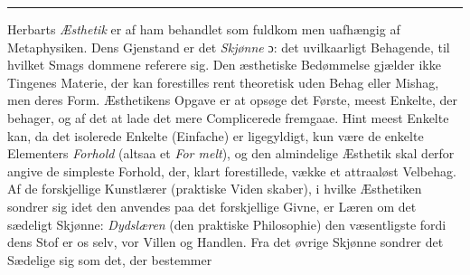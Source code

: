 \documentclass[12pt,a4paper]{book}
\newcommand{\divrule}{\begin{center}\rule{2cm}{0.4pt}\end{center}}
\begin{document}
\divrule

Herbarts \emph{Æsthetik} er af ham behandlet som fuldkom\-%
men uafhængig af Metaphysiken. Dens Gjenstand er det
\emph{Skjønne} ɔ: det uvilkaarligt Behagende, til hvilket Smags\-%
dommene referere sig. Den æsthetiske Bedømmelse gjælder
ikke Tingenes Materie, der kan forestilles rent theoretisk uden
Behag eller Mishag, men deres Form. Æsthetikens Opgave
er at opsøge det Første, meest Enkelte, der behager, og af
det at lade det mere Complicerede fremgaae. Hint meest
Enkelte kan, da det isolerede Enkelte (Einfache) er ligegyldigt,
kun være de enkelte Elementers \emph{Forhold} (altsaa et \emph{For\-%
melt}), og den almindelige Æsthetik skal derfor angive de
simpleste Forhold, der, klart forestillede, vække et attraaløst
Velbehag. Af de forskjellige Kunstlærer (praktiske Viden\-%
skaber), i hvilke Æsthetiken sondrer sig idet den anvendes
paa det forskjellige Givne, er Læren om det sædeligt Skjønne:
\emph{Dydslæren} (den praktiske Philosophie) den væsentligste fordi
dens Stof er os selv, vor Villen og Handlen. Fra det øvrige
Skjønne sondrer det Sædelige sig som det, der bestemmer
\end{document}
